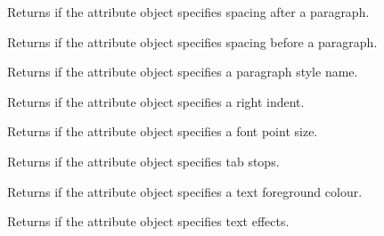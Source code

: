 
Returns \true if the attribute object specifies spacing after a paragraph.

\label{wxrichtextattrhasparagraphspacingbefore}


Returns \true if the attribute object specifies spacing before a paragraph.

\label{wxrichtextattrhasparagraphstylename}


Returns \true if the attribute object specifies a paragraph style name.

\label{wxrichtextattrhasrightindent}


Returns \true if the attribute object specifies a right indent.

\label{wxrichtextattrhassize}


Returns \true if the attribute object specifies a font point size.

\label{wxrichtextattrhastabs}


Returns \true if the attribute object specifies tab stops.

\label{wxrichtextattrhastextcolour}


Returns \true if the attribute object specifies a text foreground colour.

\label{wxrichtextattrhastexteffects}


Returns \true if the attribute object specifies text effects.

\label{wxrichtextattrhasunderlined}


